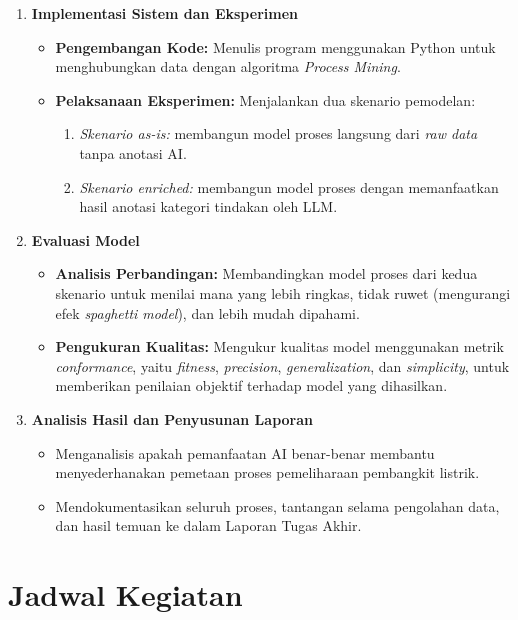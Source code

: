 \begin{enumerate}
  \item \textbf{Implementasi Sistem dan Eksperimen}
  \begin{itemize}
    \item \textbf{Pengembangan Kode:} Menulis program menggunakan Python untuk menghubungkan data dengan algoritma \textit{Process Mining}.
    \item \textbf{Pelaksanaan Eksperimen:} Menjalankan dua skenario pemodelan:
    \begin{enumerate}
      \item \textit{Skenario as-is:} membangun model proses langsung dari \textit{raw data} tanpa anotasi AI.
      \item \textit{Skenario enriched:} membangun model proses dengan memanfaatkan hasil anotasi kategori tindakan oleh LLM.
    \end{enumerate}
  \end{itemize}

  \item \textbf{Evaluasi Model}
  \begin{itemize}
    \item \textbf{Analisis Perbandingan:} Membandingkan model proses dari kedua skenario untuk menilai mana yang lebih ringkas, tidak ruwet (mengurangi efek \textit{spaghetti model}), dan lebih mudah dipahami.
    \item \textbf{Pengukuran Kualitas:} Mengukur kualitas model menggunakan metrik \textit{conformance}, yaitu \textit{fitness}, \textit{precision}, \textit{generalization}, dan \textit{simplicity}, untuk memberikan penilaian objektif terhadap model yang dihasilkan.
  \end{itemize}

  \item \textbf{Analisis Hasil dan Penyusunan Laporan}
  \begin{itemize}
    \item Menganalisis apakah pemanfaatan AI benar-benar membantu menyederhanakan pemetaan proses pemeliharaan pembangkit listrik.
    \item Mendokumentasikan seluruh proses, tantangan selama pengolahan data, dan hasil temuan ke dalam Laporan Tugas Akhir.
  \end{itemize}
\end{enumerate}

\section{Jadwal Kegiatan}


